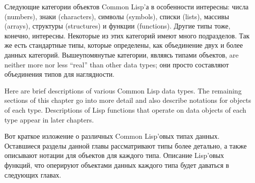 Следующие категории объектов Common Lisp'а в особенности интересны: числа (numbers), знаки (characters), символы (symbols), списки (lists), массивы (arrays), структуры (structures) и функции (functions). Другие типы тоже, конечно, интересны. Некоторые из этих категорий имеют много подразделов. Так же есть стандартные типы, которые определены, как объединение двух и более данных категорий. Вышеупомянутые категории, являясь типами объектов, are neither more nor less ``real'' than other data types; они просто составляют объединения типов для наглядности.

Here are brief descriptions of various Common Lisp data types.
The remaining sections of this chapter go into more detail
and also describe notations for objects
of each type.  Descriptions of Lisp functions that operate
on data objects of each type appear in later chapters.

Вот краткое изложение о различных Common Lisp'овых типах данных. Оставшиеся разделы данной главы рассматривают типы более детально, а также описывают нотации для объектов для каждого типа. Описание Lisp'овых функций, что оперируют объектами данных каждого типа будет даваться в следующих главах.

